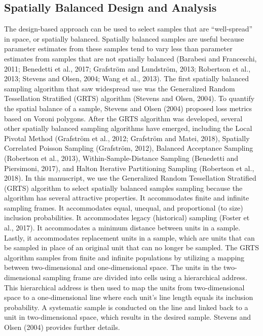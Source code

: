 \documentclass[]{elsarticle} %
\begin{document}
\hypertarget{subsec:spb_design}{%
\subsection{Spatially Balanced Design and
Analysis}\label{subsec:spb_design}}

The design-based approach can be used to select samples that are
``well-spread'' in space, or spatially balanced. Spatially balanced
samples are useful because parameter estimates from these samples tend
to vary less than parameter estimates from samples that are not
spatially balanced (Barabesi and Franceschi, 2011; Benedetti et al.,
2017; Grafström and Lundström, 2013; Robertson et al., 2013; Stevens and
Olsen, 2004; Wang et al., 2013). The first spatially balanced sampling
algorithm that saw widespread use was the Generalized Random
Tessellation Stratified (GRTS) algorithm (Stevens and Olsen, 2004). To
quantify the spatial balance of a sample, Stevens and Olsen (2004)
proposed loss metrics based on Voroni polygons. After the GRTS algorithm
was developed, several other spatially balanced sampling algorithms have
emerged, including the Local Pivotal Method (Grafström et al., 2012;
Grafström and Matei, 2018), Spatially Correlated Poisson Sampling
(Grafström, 2012), Balanced Acceptance Sampling (Robertson et al.,
2013), Within-Sample-Distance Sampling (Benedetti and Piersimoni, 2017),
and Halton Iterative Partitioning Sampling (Robertson et al., 2018). In
this manuscript, we use the Generalized Random Tessellation Stratified
(GRTS) algorithm to select spatially balanced samples sampling because
the algorithm has several attractive properties. It accommodates finite
and infinite sampling frames. It accommodates equal, unequal, and
proportional (to size) inclusion probabilities. It accommodates legacy
(historical) sampling (Foster et al., 2017). It accommodates a minimum
distance between units in a sample. Lastly, it accommodates replacement
units in a sample, which are units that can be sampled in place of an
original unit that can no longer be sampled. The GRTS algorithm samples
from finite and infinite populations by utilizing a mapping between
two-dimensional and one-dimensional space. The units in the
two-dimensional sampling frame are divided into cells using a
hierarchical address. This hierarchical address is then used to map the
units from two-dimensional space to a one-dimensional line where each
unit's line length equals its inclusion probability. A systematic sample
is conducted on the line and linked back to a unit in two-dimensional
space, which results in the desired sample. Stevens and Olsen (2004)
provides further details.
\end{document}

